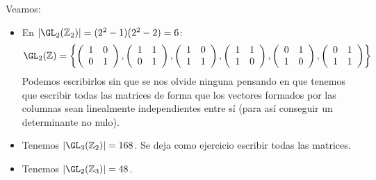 \begin{ejemplo}
    Veamos:
    \begin{itemize}
        \item En $|\GL_2(\mathbb{Z}_2)| = (2^2 - 1)(2^2-2) = 6$:
            \begin{equation*}
                \GL_2(\mathbb{Z}) = \left\{\left(\begin{array}{cc}
                    1 & 0 \\
                    0 & 1 
                \end{array}\right), \left(\begin{array}{cc}
                    1 & 1 \\
                    0 & 1 
                \end{array}\right),\left(\begin{array}{cc}
                    1 & 0 \\
                    1 & 1 
                \end{array}\right), \left(\begin{array}{cc}
                    1 & 1 \\
                    1 & 0 
                \end{array}\right),\left(\begin{array}{cc}
                    0 & 1 \\
                    1 & 0 
                \end{array}\right), \left(\begin{array}{cc}
                    0 & 1 \\
                    1 & 1 
                \end{array}\right)\right\}
            \end{equation*}
            Podemos escribirlos sin que se nos olvide ninguna pensando en que tenemos que escribir todas las matrices de forma que los vectores formados por las columnas sean linealmente independientes entre sí (para así conseguir un determinante no nulo).
        \item Tenemos $|\GL_3(\mathbb{Z}_2)| = 168$. Se deja como ejercicio escribir todas las matrices.
        \item Tenemos $|\GL_2(\mathbb{Z}_3)| = 48$.
    \end{itemize}
\end{ejemplo}


